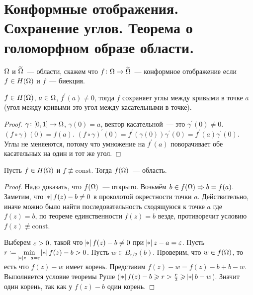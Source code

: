 \section{Конформные отображения. Сохранение углов. Теорема о голоморфном образе области.}

\begin{definition}
    $\Omega$ и $\widetilde{\Omega}$~--- области,
    скажем что $f \colon \Omega \to \widetilde{\Omega}$~--- конформное
    отображение если $f \in H(\Omega)$ и $f$~--- биекция.
\end{definition}

\begin{theorem}
    $f\in H(\Omega)$, $a \in \Omega$, $f^\prime(a) \ne 0$,
    тогда $f$ сохраняет углы между кривыми в точке $a$
    (угол между кривыми это угол между касательными в точке).
\end{theorem}

\begin{proof}
    $\gamma\colon [0, 1] \to \Omega$, $\gamma(0) = a$,
    вектор касательной~--- это $\gamma^\prime(0) \ne 0$.
    $(f \circ \gamma )(0) = f(a)$.
    $(f\circ\gamma)^\prime(0) = f^\prime(\gamma(0))\gamma^\prime(0)
        = f^\prime(a)\gamma^\prime(0)$.
    Углы не меняеются, потому что умножение на $f^\prime(a)$
    поворачивает обе касательных на один и тот же угол.
\end{proof}

\begin{theorem}
    Пусть $f \in H(\Omega)$ и $f \not\equiv \mathrm{const}$.
    Тогда $f(\Omega)$~--- область.
\end{theorem}

\begin{proof}
    Надо доказать, что $f(\Omega)$~--- открыто.
    Возьмём $b \in f(\Omega) \Rightarrow b = f(a)$.
    Заметим, что $\abs{f(z) - b} \ne 0$ в проколотой окрестности
    точки $a$. Действительно, иначе можно было найти
    последовательность сходящуюся к точке $a$
    где $f(z) = b$, по теореме единственности $f(z) = b$
    везде, противоречит условию $f(z) \not\equiv \mathrm{const}$.

    Выберем $\varepsilon > 0$, такой что $\abs{f(z) - b} \ne 0$
    при $\abs{z-a}=\ve$. Пусть $r \coloneqq \min\limits_{\abs{z-a}=\ve}
        \abs{f(z) - b} > 0$. Пусть $w \in B_{r/2} (b)$.
    Проверим, что $w \in f(\Omega)$, то есть что
    $f(z) - w$ имеет корень. Представим
    $f(z) - w = f(z) - b + b - w$.
    Выполняется условие теоремы Руше ($\abs{f(z) - b} \ge
        r > \frac{r}{2} \ge \abs{b-w}$).
    Значит один корень, так как у $f(z) - b$ один корень.
\end{proof}

\newpage

